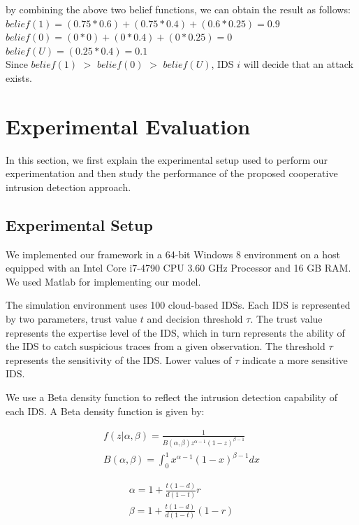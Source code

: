 \documentclass[conference]{IEEEtran}
\begin{document}
by combining the above two belief functions, we can
obtain the result as follows: \\
$belief(1)=(0.75 \ast 0.6) + (0.75 \ast 0.4) + (0.6 \ast 0.25) = 0.9$\\
$belief(0) =(0 \ast 0) + (0 \ast 0.4) + (0 \ast 0.25) = 0$\\
$belief(U) =(0.25 \ast 0.4) = 0.1$\\
Since $belief(1)$ $>$ $belief(0)$ $>$ $belief(U)$, IDS $i$ will decide that an attack exists.


\section{Experimental Evaluation}
\label{sec:Experiments}
In this section, we first explain the experimental setup
used to perform our experimentation and then study the
performance of the proposed cooperative intrusion detection approach.

\subsection{Experimental Setup}

We implemented our framework in a 64-bit Windows 8 environment on a host equipped with an Intel Core i7-4790 CPU 3.60 GHz Processor and 16 GB RAM. We used Matlab for implementing our model.

The simulation environment uses 100 cloud-based IDSs. Each IDS is represented by two parameters, trust value $t$ and decision threshold $\tau$. The trust value represents the expertise level of the IDS, which in turn represents the ability of the IDS to catch suspicious traces from a given observation. The threshold $\tau$ represents the sensitivity of the IDS. Lower values of $\tau$ indicate a more sensitive IDS.

We use a Beta density function to reflect the intrusion detection capability of each IDS. A Beta density function is given by:

\begin{equation}
\begin{aligned}
f(z|\alpha,\beta)= \frac{1}{B(\alpha,\beta)z^{\alpha-1} (1-z)^{\beta-1}}\\
B(\alpha,\beta) = \int_{0}^{1} x^{\alpha-1}(1-x)^{\beta-1}dx
\end{aligned}
\end{equation}

\begin{equation}
\begin{aligned}
\alpha = 1 + \frac{t(1-d)}{d(1-t)}r \\
\beta = 1 + \frac{t(1-d)}{d(1-t)}(1-r)
\end{aligned}
\end{equation}
\end{document}
